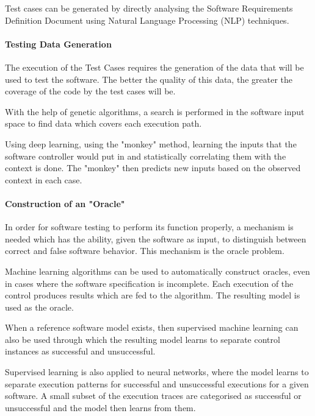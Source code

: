 \documentclass[12pt]{article}
\begin{document}
\par Test cases can be generated by directly analysing the Software Requirements Definition Document using Natural Language Processing (NLP) techniques.

\paragraph{Testing Data Generation}
The execution of the Test Cases requires the generation of the data that will be used to test the software. The better the quality of this data, the greater the coverage of the code by the test cases will be.

\par With the help of genetic algorithms, a search is performed in the software input space to find data which covers each execution path.

\par Using deep learning, using the "monkey" method, learning the inputs that the software controller would put in and statistically correlating them with the context is done. The "monkey" then predicts new inputs based on the observed context in each case.

\paragraph{Construction of an "Oracle"}
In order for software testing to perform its function properly, a mechanism is needed which has the ability, given the software as input, to distinguish between correct and false software behavior. This mechanism is the oracle problem.

\par Machine learning algorithms can be used to automatically construct oracles, even in cases where the software specification is incomplete. Each execution of the control produces results which are fed to the algorithm. The resulting model is used as the oracle.

\par When a reference software model exists, then supervised machine learning can also be used through which the resulting model learns to separate control instances as successful and unsuccessful.

\par Supervised learning is also applied to neural networks, where the model learns to separate execution patterns for successful and unsuccessful executions for a given software. A small subset of the execution traces are categorised as successful or unsuccessful and the model then learns from them.
\end{document}
